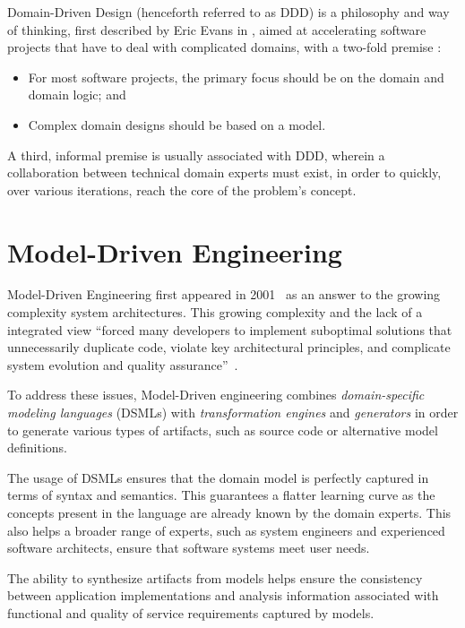 Domain-Driven Design (henceforth referred to as DDD) is a philosophy and way of thinking, first described by Eric Evans in \cite{ddd_book}, aimed at accelerating software projects that have to deal with complicated domains,  with a two-fold premise \cite{ddd_website}:

\begin{itemize}
  \item For most software projects, the primary focus should be on the domain and domain logic; and
  \item Complex domain designs should be based on a model.
\end{itemize}

A third, informal premise is usually associated with DDD, wherein a collaboration between technical domain experts must exist, in order to quickly, over various iterations, reach the core of the problem's concept.

\section{Model-Driven Engineering}\label{sec:mda}

Model-Driven Engineering first appeared in 2001~\cite{Mil03} as an answer to the growing complexity system architectures. This growing complexity and the lack of a integrated view ``forced many developers to implement suboptimal solutions that unnecessarily duplicate code, violate key architectural principles, and complicate system evolution and quality assurance''~\cite{Sch06}.

To address these issues, Model-Driven engineering combines \emph{domain-specific modeling languages} (DSMLs) with \emph{transformation engines} and \emph{generators} in order to generate various types of artifacts, such as source code or alternative model definitions.

The usage of DSMLs ensures that the domain model is perfectly captured in terms of syntax and semantics. This guarantees a flatter learning curve as the concepts present in the language are already known by the domain experts. This also helps a broader range of experts, such as system engineers and experienced software architects, ensure that software systems meet user needs.

The ability to synthesize artifacts from models helps ensure the consistency between application implementations and analysis information associated with functional and quality of service requirements captured by models.

